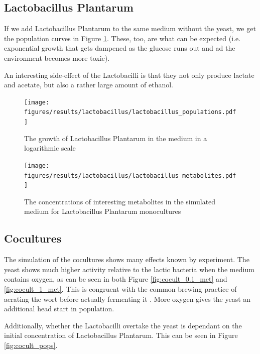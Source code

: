 	\subsection{Lactobacillus Plantarum}
		If we add Lactobacillus Plantarum to the same medium without the yeast, we get the population curves in Figure \ref{fig:lb_pop}.
		These, too, are what can be expected (i.e. exponential growth that gets dampened as the glucose runs out and ad the environment becomes more toxic).
		
		An interesting side-effect of the Lactobacilli is that they not only produce lactate and acetate, but also a rather large amount of ethanol.
		\begin{figure}[h]
			\centering
			\texttt{[image: figures/results/lactobacillus/lactobacillus\_populations.pdf]}
			\caption{The growth of Lactobacillus Plantarum in the medium in a logarithmic scale}
			\label{fig:lb_pop}
		\end{figure}
		
		\begin{figure}[h]
			\centering
			\texttt{[image: figures/results/lactobacillus/lactobacillus\_metabolites.pdf]}
			\caption{The concentrations of interesting metabolites in the simulated medium for Lactobacillus Plantarum monocultures}
			\label{fig:lb_met}
		\end{figure}
	
	\subsection{Cocultures}
		The simulation of the cocultures shows many effects known by experiment.
		The yeast shows much higher activity relative to the lactic bacteria when the medium contains oxygen, as can be seen in both Figure \ref{fig:cocult_0.1_met} and \ref{fig:cocult_1_met}.
		This is congruent with the common brewing practice of aerating the wort before actually fermenting it \cite[P. 168]{daniels1996designing}.
		More oxygen gives the yeast an additional head start in population.
		
		Additionally, whether the Lactobacilli overtake the yeast is dependant on the initial concentration of Lactobacillus Plantarum.
		This can be seen in Figure \ref{fig:cocult_pops}.
		
